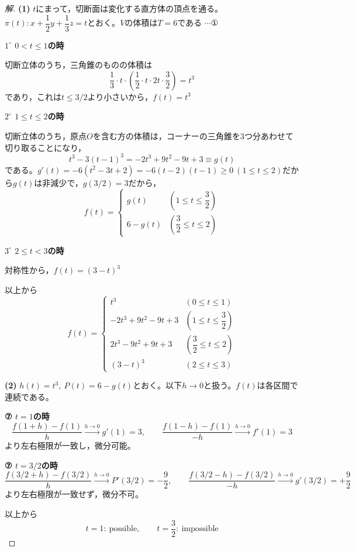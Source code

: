 \documentclass[../main.tex]{subfiles}
\begin{document}
\begin{proof}[解]
  \textbf{(1)} $t$にまって，切断面は変化する直方体の頂点を通る。$\pi(t): x+\dfrac12y+\dfrac13z=t$とおく。$V$の体積は$T=6$である $\cdots$①

  \textbf{$1^\circ$ $0<t\le1$の時}

  切断立体のうち，三角錐のものの体積は
  \[
    \frac13\cdot t\cdot\left(\frac12\cdot t\cdot 2t\cdot\frac{3}{2}\right)=t^3
  \]
  であり，これは$t\le3/2$より小さいから，$f(t)=t^3$

  \textbf{$2^\circ$ $1\le t\le2$の時}

  切断立体のうち，原点$O$を含む方の体積は，コーナーの三角錐を3つ分あわせて切り取ることになり，
  \[
    t^3-3(t-1)^3=-2t^3+9t^2-9t+3\equiv g(t)
  \]
  である。$g'(t)=-6(t^2-3t+2)=-6(t-2)(t-1)\ge0\ (1\le t\le2)$だから$g(t)$は非減少で，$g(3/2)=3$だから，
  \[
    f(t)=
    \begin{cases}
      g(t) & \left(1\le t\le\dfrac32\right) \\
      6-g(t) & \left(\dfrac32\le t\le2\right)
    \end{cases}
  \]

  \textbf{$3^\circ$ $2\le t<3$の時}

  対称性から，$f(t)=(3-t)^3$

  以上から
  \[
    f(t)=
    \begin{cases}
      t^3 & (0\le t\le1) \\
      -2t^3+9t^2-9t+3 & \left(1\le t\le\dfrac32\right) \\
      2t^3-9t^2+9t+3 & \left(\dfrac32\le t\le2\right) \\
      (3-t)^3 & (2\le t\le3)
    \end{cases}
  \]

  \textbf{(2)} $h(t)=t^3,\ P(t)=6-g(t)$とおく。以下$h\to0$と扱う。$f(t)$は各区間で連続である。

  \textbf{⑦ $t=1$の時}
  \[
    \frac{f(1+h)-f(1)}{h}\xrightarrow{h\to0}g'(1)=3, \qquad \frac{f(1-h)-f(1)}{-h}\xrightarrow{h\to0}f'(1)=3
  \]
  より左右極限が一致し，微分可能。

  \textbf{⑦ $t=3/2$の時}
  \[
    \frac{f(3/2+h)-f(3/2)}{h}\xrightarrow{h\to0}P'(3/2)=-\frac92, \qquad \frac{f(3/2-h)-f(3/2)}{-h}\xrightarrow{h\to0}g'(3/2)=+\frac92
  \]
  より左右極限が一致せず，微分不可。

  以上から
  \[
    t=1:\ \text{possible}, \qquad t=\frac32:\ \text{impossible}
  \]
\end{proof}

\newpage
\end{document}
